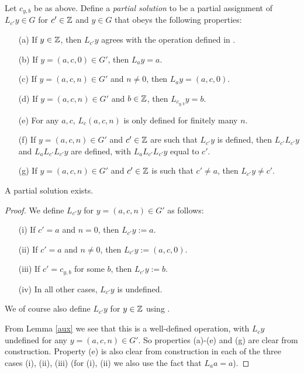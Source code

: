 Let $c_{y,b}$ be as above. Define a \emph{partial solution} to be a partial assignment of $L_{c'} y \in G$ for $c' \in \mathbb{Z}$ and $y \in G$ that obeys the following properties:
\begin{itemize}
\item[(a)] If $y \in \mathbb{Z}$, then $L_{c'} y$ agrees with the operation defined in .
\item[(b)] If $y = (a,c,0) \in G'$, then $L_a y = a$.
\item[(c)] If $y = (a,c,n) \in G'$ and $n \neq 0$, then $L_a y = (a,c,0)$.
\item[(d)] If $y = (a,c,n) \in G'$ and $b \in \mathbb{Z}$, then $L_{c_{y,b}} y = b$.
\item[(e)] For any $a,c$, $L_c (a,c,n)$ is only defined for finitely many $n$.
\item[(f)] If $y = (a,c,n) \in G'$ and $c' \in \mathbb{Z}$ are such that $L_{c'} y$ is defined, then $L_{c'} L_{c'} y$ and $L_a L_{c'} L_{c'} y$ are defined, with $L_a L_{c'} L_{c'} y$ equal to $c'$.
\item[(g)] If $y = (a,c,n) \in G'$ and $c' \in \mathbb{Z}$ is such that $c' \neq a$, then $L_{c'} y \neq c'$.
\end{itemize}

\begin{lemma}\label{part-exist}  A partial solution exists.
\end{lemma}

\begin{proof}  We define $L_{c'} y$ for $y = (a,c,n) \in G'$ as follows:
\begin{itemize}
  \item[(i)] If $c' = a$ and $n=0$, then $L_{c'} y := a$.
  \item[(ii)] If $c' = a$ and $n \neq 0$, then $L_{c'} y := (a,c,0)$.
  \item[(iii)] If $c' = c_{y,b}$ for some $b$, then $L_{c'} y := b$.
  \item[(iv)] In all other cases, $L_{c'} y$ is undefined.
\end{itemize}
We of course also define $L_{c'} y$ for $y \in \mathbb{Z}$ using .

From Lemma \ref{aux} we see that this is a well-defined operation, with $L_c y$ undefined for any $y = (a,c,n) \in G'$.  So properties (a)-(e) and (g) are clear from construction.  Property (e) is also clear from construction in each of the three cases (i), (ii), (iii) (for (i), (ii) we also use the fact that $L_a a = a$).
\end{proof}

